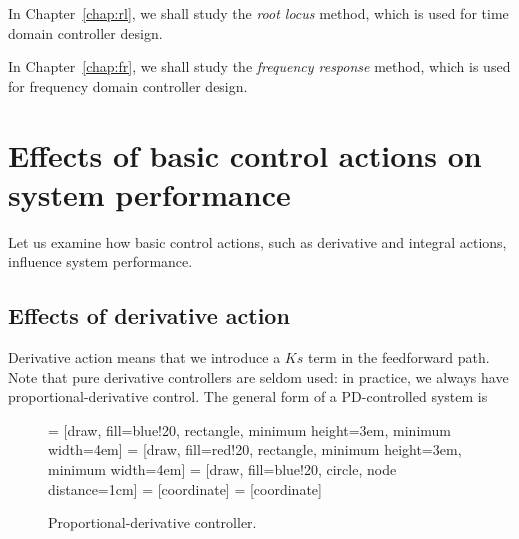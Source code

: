 \documentclass[a4paper,11pt]{report}
\theoremstyle{definition}
\begin{document}
In Chapter~\ref{chap:rl}, we shall study the \emph{root locus} method,
which is used for time domain controller design.

In Chapter~\ref{chap:fr}, we shall study the \emph{frequency response}
method, which is used for frequency domain controller design.



\section{Effects of basic control actions on system performance}

Let us examine how basic control actions, such as derivative and
integral actions, influence system performance.

\subsection{Effects of derivative action}
\label{sec:effectsd}

Derivative action means that we introduce a $Ks$ term in the
feedforward path. Note that pure derivative controllers are seldom
used: in practice, we always have proportional-derivative control. The
general form of a PD-controlled system is

\begin{figure}[H]
  \label{fig:derivative}
  \centering
   = [draw, fill=blue!20, rectangle, minimum height=3em, minimum width=4em]
   = [draw, fill=red!20, rectangle, minimum height=3em, minimum width=4em]
   = [draw, fill=blue!20, circle, node distance=1cm]
   = [coordinate]
   = [coordinate]
  \caption{Proportional-derivative controller.}
\end{figure}
\end{document}
